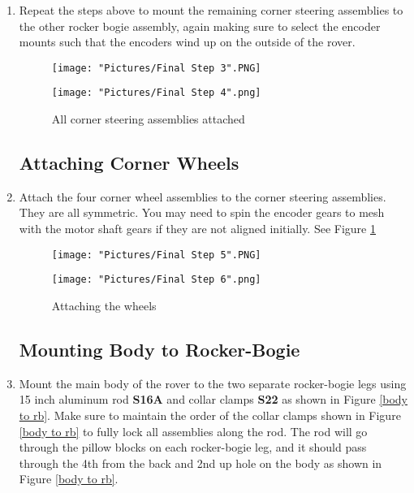 \documentclass[12pt]{article}
\begin{document}
\begin{enumerate}
\item Repeat the steps above to mount the remaining corner steering assemblies to the other rocker bogie assembly, again making sure to select the encoder mounts such that the encoders wind up on the outside of the rover.

\begin{figure}[H]
  \centering
  \begin{minipage}[b]{0.45\textwidth}
    \texttt{[image: "Pictures/Final Step 3".PNG]}
  \end{minipage}
  \hfill
  \begin{minipage}[b]{0.45\textwidth}
    \texttt{[image: "Pictures/Final Step 4".png]}
  \end{minipage}
  \caption{All corner steering assemblies attached}
\end{figure}

\subsection{Attaching Corner Wheels}

\item Attach the four corner wheel assemblies to the corner steering assemblies. They are all symmetric. You may need to spin the encoder gears to mesh with the motor shaft gears if they are not aligned initially. See Figure \ref{wheels finished}

\begin{figure}[H]
  \centering
  \begin{minipage}[b]{0.45\textwidth}
    \texttt{[image: "Pictures/Final Step 5".PNG]}
  \end{minipage}
  \hfill
  \begin{minipage}[b]{0.45\textwidth}
    \texttt{[image: "Pictures/Final Step 6".png]}
  \end{minipage}
  \caption{Attaching the wheels}
  \label{wheels finished}
\end{figure}

\subsection{Mounting Body to Rocker-Bogie}

\item Mount the main body of the rover to the two separate rocker-bogie legs using 15 inch aluminum rod \textbf{S16A} and collar clamps \textbf{S22} as shown in Figure \ref{body to rb}. Make sure to maintain the order of the collar clamps shown in Figure \ref{body to rb} to fully lock all assemblies along the rod. The rod will go through the pillow blocks on each rocker-bogie leg, and it should pass through the 4th from the back and 2nd up hole on the body as shown in Figure \ref{body to rb}.


\end{enumerate}
\end{document}
